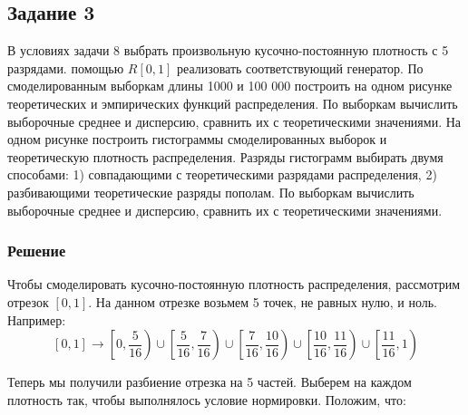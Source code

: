 \documentclass{article}
\begin{document}
\subsection{Задание 3}
В условиях задачи 8 выбрать произвольную кусочно-постоянную плотность с 5 разрядами. 
помощью $R[0,1]$ реализовать соответствующий генератор. По смоделированным выборкам длины
1000 и 100 000 построить на одном рисунке теоретических и эмпирических функций
распределения. По выборкам вычислить выборочные среднее и дисперсию, сравнить их с 
теоретическими значениями. На одном рисунке построить гистограммы смоделированных выборок
и теоретическую плотность распределения. Разряды гистограмм выбирать двумя способами: 1)
совпадающими с теоретическими разрядами распределения, 2) разбивающими теоретические 
разряды пополам. По выборкам вычислить выборочные среднее и дисперсию, сравнить их с
теоретическими значениями.
\subsubsection{Решение}
Чтобы смоделировать кусочно-постоянную плотность распределения, рассмотрим отрезок 
$[0, 1]$. На данном отрезке возьмем 5 точек, не равных нулю, и ноль. Например:
\[[0, 1] \to \left[0, \frac{5}{16}\right) \cup \left[\frac{5}{16}, \frac{7}{16}\right)
\cup \left[\frac{7}{16}, \frac{10}{16}\right) \cup \left[\frac{10}{16},
\frac{11}{16}\right) \cup \left[\frac{11}{16}, 1\right) \]

Теперь мы получили разбиение отрезка на 5 частей. Выберем на каждом плотность так, чтобы
выполнялось условие нормировки. Положим, что:
\end{document}
